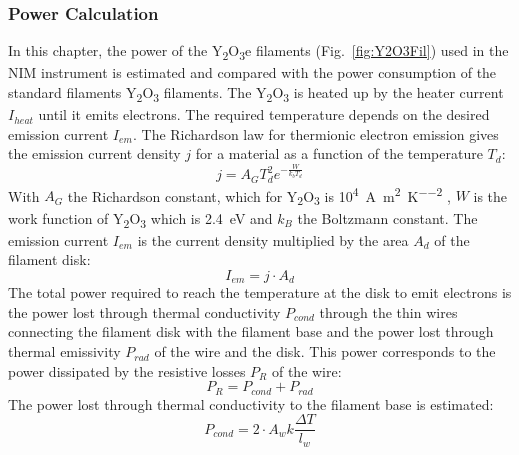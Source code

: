 		\subsubsection{Power Calculation}
		In this chapter, the power of the Y\textsubscript{2}O\textsubscript{3}e filaments (Fig.~\ref{fig:Y2O3Fil}) used in the NIM instrument is estimated and compared with the power consumption of the standard filaments Y\textsubscript{2}O\textsubscript{3} filaments.
		The Y\textsubscript{2}O\textsubscript{3} is heated up by the heater current $I_{heat}$ until it emits electrons. The required temperature depends on the desired emission current $I_{em}$. The Richardson law for thermionic electron emission gives the emission current density $j$ for a material as a function of the temperature $T_d$:
		\begin{equation}
			j = A_GT_d^2e^{-\frac{W}{k_bT_d}}
			\label{eq:Richardson}
		\end{equation} %
		With $A_G$ the Richardson constant, which for Y\textsubscript{2}O\textsubscript{3} is 10\textsuperscript{4}~\si{\ampere\per\square\meter\per\square\kelvin} \cite{MaterHandbookCardaelli}, $W$ is the work function of Y\textsubscript{2}O\textsubscript{3} which is 2.4~eV \cite{MaterHandbookCardaelli} and $k_B$ the Boltzmann constant. The emission current $I_{em}$ is the current density multiplied by the area $A_{d}$ of the filament disk:
		\begin{equation}
			I_{em} = j\cdot A_{d}
		\end{equation}
		The total power required to reach the temperature at the disk to emit electrons is the power lost through thermal conductivity $P_{cond}$ through the thin wires connecting the filament disk with the filament base and the power lost through thermal emissivity $P_{rad}$ of the wire and the disk. This power corresponds to the power dissipated by the resistive losses $P_{R}$ of the wire:
		\begin{equation}
			P_{R} = P_{cond} + P_{rad}
		\end{equation}
		The power lost through thermal conductivity to the filament base is estimated:
		\begin{equation}
			P_{cond} = 2\cdot A_{w}k\frac{\Delta T}{l_{w}}
		\end{equation}
